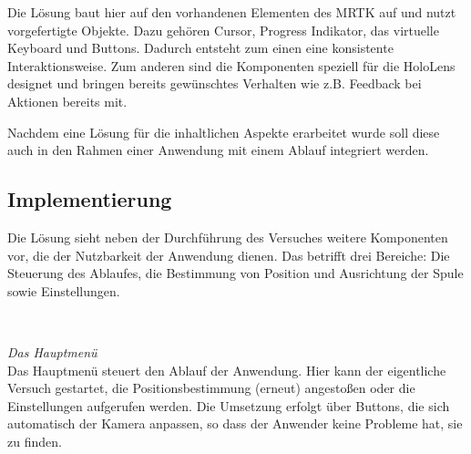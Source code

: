 Die Lösung baut hier auf den vorhandenen Elementen des MRTK auf und nutzt vorgefertigte Objekte. Dazu gehören Cursor, Progress Indikator, das virtuelle Keyboard und Buttons. Dadurch entsteht zum einen eine konsistente Interaktionsweise. Zum anderen sind die Komponenten speziell für die HoloLens designet und bringen bereits gewünschtes Verhalten wie z.B. Feedback bei Aktionen bereits mit.

Nachdem eine Lösung für die inhaltlichen Aspekte erarbeitet wurde soll diese auch in den Rahmen einer Anwendung mit einem Ablauf integriert werden.

\subsection{Implementierung}
\label{sec-4-3}
Die Lösung sieht neben der Durchführung des Versuches weitere Komponenten vor, die der Nutzbarkeit der Anwendung dienen. Das betrifft drei Bereiche: Die Steuerung des Ablaufes, die Bestimmung von Position und Ausrichtung der Spule sowie Einstellungen.

\vspace{8px}
\begin{center}
	\\
\end{center}
\vspace{6px}

\textit{Das Hauptmenü}\\
Das Hauptmenü steuert den Ablauf der Anwendung. Hier kann der eigentliche Versuch gestartet, die Positionsbestimmung (erneut) angestoßen oder die Einstellungen aufgerufen werden. Die Umsetzung erfolgt über Buttons, die sich automatisch der Kamera anpassen, so dass der Anwender keine Probleme hat, sie zu finden.\\

